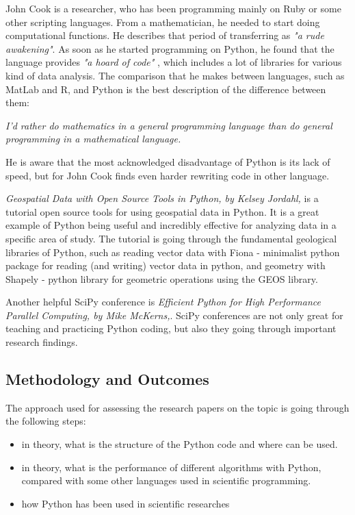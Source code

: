 John Cook is a researcher, who has been programming mainly on Ruby or some other scripting languages. From a mathematician, he needed to start doing computational functions. He describes that period of transferring as \textit{"a rude awakening"}.\cite{johnSciPy} As soon as he started programming on Python, he found that the language provides \textit{"a hoard of code"} \cite{johnSciPy}, which includes a lot of libraries for various kind of data analysis. The comparison that he makes between languages, such as MatLab and R, and Python is the best description of the difference between them:

\textit{I’d rather do mathematics in a general programming language than do general programming in a mathematical language.}

He is aware that the most acknowledged disadvantage of Python is its lack of speed, but for John Cook finds even harder rewriting code in other language. 

\textit{Geospatial Data with Open Source Tools in Python, by Kelsey Jordahl,} is a tutorial open source tools for using geospatial data in Python. \cite{efficientPython} It is a great example of Python being useful and incredibly effective for analyzing data in a specific area of study. The tutorial is going through the fundamental geological libraries of Python, such as reading vector data with Fiona - minimalist python package for reading (and writing) vector data in python, and geometry with Shapely - python library for geometric operations using the GEOS library. 

Another helpful SciPy conference is \textit{Efficient Python for High Performance Parallel Computing, by Mike McKerns,}. \cite{efficientPython} SciPy conferences are not only great for teaching and practicing Python coding, but also they going through important research findings. \cite{sciPy} 

\subsection*{Methodology and Outcomes}
The approach used for assessing the research papers on the topic is going through the following steps:
\begin{itemize}
  \item in theory, what is the structure of the Python code and where can be used. 
  \item in theory, what is the performance of different algorithms with Python, compared with some other languages used in scientific programming.
  \item how Python has been used in scientific researches 
 \end{itemize}
 
